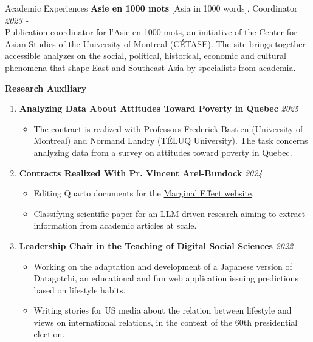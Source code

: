 \documentclass{resume} %
\begin{document}
\begin{rSection}{Academic Experiences}
{\bf Asie en 1000 mots}{ [Asia in 1000 words], Coordinator} \hfill {\em 2023 - }\\
Publication coordinator for l'Asie en 1000 mots, an initiative of the Center for Asian Studies of the University of Montreal (CÉTASE). The site brings together accessible analyzes on the social, political, historical, economic and cultural phenomena that shape East and Southeast Asia by specialists from academia. 

\clearpage

{\bf Research Auxiliary}
\begin{enumerate}
    \item \textbf{Analyzing Data About Attitudes Toward Poverty in Quebec} \hfill {\em 2025}
        \begin{itemize}
            \item The contract is realized with Professors Frederick Bastien (University of Montreal) and Normand Landry (TÉLUQ University). The task concerns analyzing data from a survey on attitudes toward poverty in Quebec.
        \end{itemize}
    \item \textbf{Contracts Realized With Pr. Vincent Arel-Bundock} \hfill {\em 2024}
        \begin{itemize}
          \item Editing Quarto documents for the \href{https://marginaleffects.com}{Marginal Effect website}.
            \item Classifying scientific paper for an LLM driven research aiming to extract information from academic articles at scale.
        \end{itemize}
    \item \textbf{Leadership Chair in the Teaching of Digital Social Sciences} \hfill {\em 2022 -}
        \begin{itemize}
            \item {Working on the adaptation and development of a Japanese version of Datagotchi, an educational and fun web application issuing predictions based on lifestyle habits.}
            \item Writing stories for US media about the relation between lifestyle and views on international relations, in the context of the 60th presidential election. 

\end{itemize}
\end{enumerate}
\end{rSection}
\end{document}
